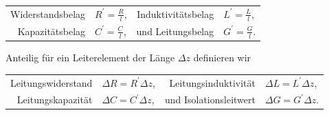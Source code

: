 \documentclass[paper=a4, parskip=half-, ngerman, fontsize=11pt]{scrreprt}
\begin{document}
\begin{tabular}{r l r l}
    Widerstandsbelag & $R^{\prime} = \frac{R}{l}$, & Induktivitätsbelag & $L^{\prime} = \frac{L}{l}$, \\
\addlinespace
    Kapazitätsbelag & $C^{\prime} = \frac{C}{l}$, & und Leitungsbelag & $G^{\prime} = \frac{G}{l}$. \\
\end{tabular}

Anteilig für ein Leiterelement der Länge $\Delta z$ definieren wir

\begin{tabular}{r l r l}
    Leitungswiderstand & $\Delta R = R^{\prime} \Delta z$, &
    Leitungsinduktivität & $\Delta L = L^{\prime} \Delta z$, \\
\addlinespace
    Leitungskapazität & $\Delta C = C^{\prime} \Delta z$, &
    und Isolationsleitwert & $\Delta G = G^{\prime} \Delta z$. \\
\end{tabular}
\end{document}
